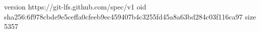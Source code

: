 version https://git-lfs.github.com/spec/v1
oid sha256:6f978cbde9e5ceffa0cfeeb9ec459407b4c3255fd45a8a63bd284c03f116ca97
size 5357
